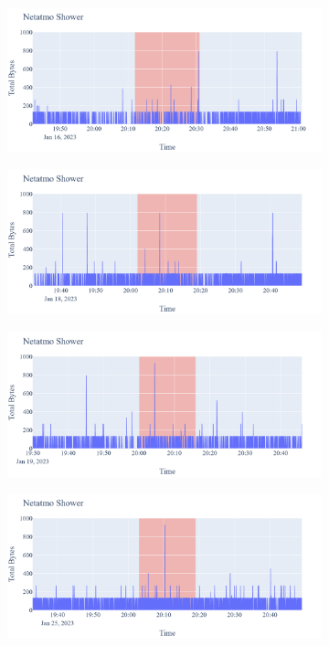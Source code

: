 \begin{figure}[H]
\begin{subfigure}[b]{0.47\textwidth}
        \centering
        \includegraphics[width=1.2\hsize]{figures/Netatmo_Shower_Bytes_16.01.png}
    \end{subfigure}
    \begin{subfigure}[b]{0.47\textwidth}
        \centering
        \includegraphics[width=1.2\hsize]{figures/Netatmo_Shower_Bytes_18.01.png}
    \end{subfigure}
    \begin{subfigure}[b]{0.47\textwidth}
        \centering
        \includegraphics[width=1.2\hsize]{figures/Netatmo_Shower_Bytes_19.01.png}
    \end{subfigure}
    \begin{subfigure}[b]{0.47\textwidth}
        \centering
        \includegraphics[width=1.2\hsize]{figures/Netatmo_Shower_Bytes_25.01.png}

\end{subfigure}
\end{figure}
